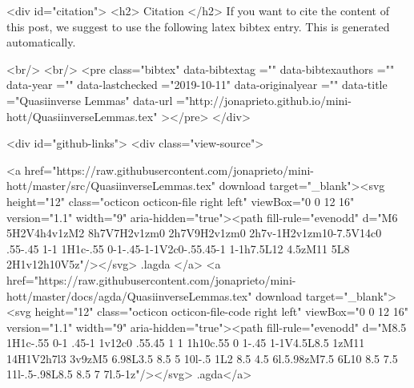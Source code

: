   
  <div id="citation">
  <h2> Citation </h2>
  If you want to cite the content of this post,
  we suggest to use the following latex bibtex entry.
  This is generated automatically.

  <br/>
  <br/>
  <pre class="bibtex"
       data-bibtextag =""
       data-bibtexauthors =""
       data-year =""
       data-lastchecked ="2019-10-11"
       data-originalyear =""
       data-title ="Quasiinverse Lemmas"
       data-url ="http://jonaprieto.github.io/mini-hott/QuasiinverseLemmas.tex"
  ></pre>
  </div>
  

  <div id="github-links">
    <div class="view-source">
      
        <a href="https://raw.githubusercontent.com/jonaprieto/mini-hott/master/src/QuasiinverseLemmas.tex" download target="_blank"><svg height="12" class="octicon octicon-file right left" viewBox="0 0 12 16" version="1.1" width="9" aria-hidden="true"><path fill-rule="evenodd" d="M6 5H2V4h4v1zM2 8h7V7H2v1zm0 2h7V9H2v1zm0 2h7v-1H2v1zm10-7.5V14c0 .55-.45 1-1 1H1c-.55 0-1-.45-1-1V2c0-.55.45-1 1-1h7.5L12 4.5zM11 5L8 2H1v12h10V5z"/></svg> .lagda </a>
        <a href="https://raw.githubusercontent.com/jonaprieto/mini-hott/master/docs/agda/QuasiinverseLemmas.tex" download target="_blank"><svg height="12" class="octicon octicon-file-code right left" viewBox="0 0 12 16" version="1.1" width="9" aria-hidden="true"><path fill-rule="evenodd" d="M8.5 1H1c-.55 0-1 .45-1 1v12c0 .55.45 1 1 1h10c.55 0 1-.45 1-1V4.5L8.5 1zM11 14H1V2h7l3 3v9zM5 6.98L3.5 8.5 5 10l-.5 1L2 8.5 4.5 6l.5.98zM7.5 6L10 8.5 7.5 11l-.5-.98L8.5 8.5 7 7l.5-1z"/></svg> .agda</a>
      
